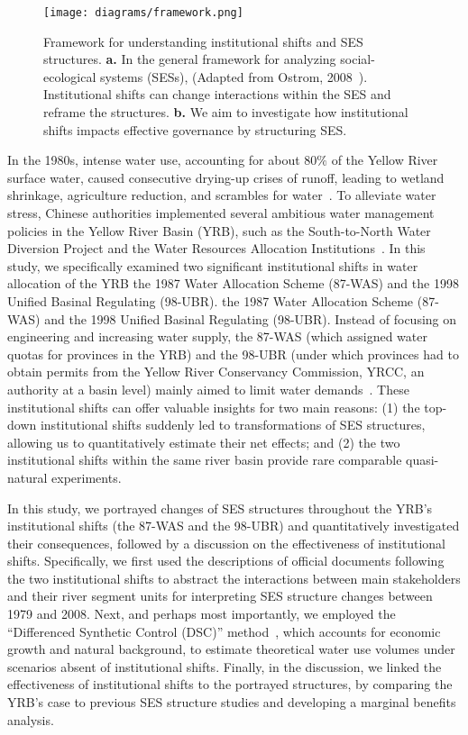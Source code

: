 \begin{figure}[!ht]
	\centering
	\texttt{[image: diagrams/framework.png]}
	\caption{
		Framework for understanding institutional shifts and SES structures. \textbf{a.} In the general framework for analyzing social-ecological systems (SESs), (Adapted from Ostrom, 2008~\cite{ostrom2009}). Institutional shifts can change interactions within the SES and reframe the structures.  \textbf{b.} We aim to investigate how institutional shifts impacts effective governance by structuring SES.}\label{fig:framework}
\end{figure}

In the 1980s, intense water use, accounting for about $80\%$ of the Yellow River surface water, caused consecutive drying-up crises of runoff, leading to wetland shrinkage, agriculture reduction, and scrambles for water~\cite{wohlfart2016}.
To alleviate water stress, Chinese authorities implemented several ambitious water management policies in the Yellow River Basin (YRB), such as the South-to-North Water Diversion Project and the Water Resources Allocation Institutions~\cite{long2020, wang2019d}.
In this study, we specifically examined two significant institutional shifts in water allocation of the YRB\: the 1987 Water Allocation Scheme (87-WAS) and the 1998 Unified Basinal Regulating (98-UBR).
the 1987 Water Allocation Scheme (87-WAS) and the 1998 Unified Basinal Regulating (98-UBR).
Instead of focusing on engineering and increasing water supply, the 87-WAS (which assigned water quotas for provinces in the YRB) and the 98-UBR (under which provinces had to obtain permits from the Yellow River Conservancy Commission, YRCC, an authority at a basin level) mainly aimed to limit water demands~\cite{bouckaert2022, speed2013}.
These institutional shifts can offer valuable insights for two main reasons:
(1) the top-down institutional shifts suddenly led to transformations of SES structures, allowing us to quantitatively estimate their net effects; and (2) the two institutional shifts within the same river basin provide rare comparable quasi-natural experiments.

In this study, we portrayed changes of SES structures throughout the YRB's institutional shifts (the 87-WAS and the 98-UBR) and quantitatively investigated their consequences, followed by a discussion on the effectiveness of institutional shifts.
Specifically, we first used the descriptions of official documents following the two institutional shifts to abstract the interactions between main stakeholders and their river segment units for interpreting SES structure changes between 1979 and 2008.
Next, and perhaps most importantly, we employed the ``Differenced Synthetic Control (DSC)'' method~\cite{arkhangelsky2021}, which accounts for economic growth and natural background, to estimate theoretical water use volumes under scenarios absent of institutional shifts.
Finally, in the discussion, we linked the effectiveness of institutional shifts to the portrayed structures, by comparing the YRB's case to previous SES structure studies and developing a marginal benefits analysis.

